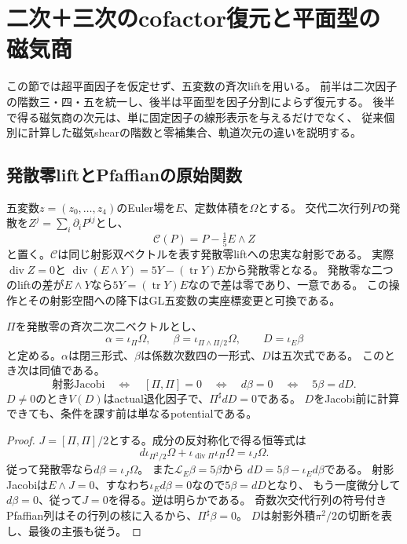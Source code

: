 \section{二次＋三次のcofactor復元と平面型の磁気商}\label{sec:quadric-reconstruction}
この節では超平面因子を仮定せず、五変数の斉次liftを用いる。
前半は二次因子の階数三・四・五を統一し、後半は平面型を因子分割によらず復元する。
後半で得る磁気商の次元は、単に固定因子の線形表示を与えるだけでなく、
従来個別に計算した磁気shearの階数と零補集合、軌道次元の違いを説明する。

\subsection{発散零liftとPfaffianの原始関数}
五変数$z=(z_0,\ldots,z_4)$のEuler場を$E$、定数体積を$\Omega$とする。
交代二次行列$P$の発散を$Z^j=\sum_i\partial_iP^{ij}$とし、
\[
 \mathcal C(P)=P-\tfrac15 E\wedge Z
\]
と置く。$\mathcal C$は同じ射影双ベクトルを表す発散零liftへの忠実な射影である。
実際$\operatorname{div}Z=0$と
$\operatorname{div}(E\wedge Y)=5Y-(\operatorname{tr}Y)E$から発散零となる。
発散零な二つのliftの差が$E\wedge Y$なら$5Y=(\operatorname{tr}Y)E$なので差は零であり、一意である。
この操作とその射影空間への降下はGL五変数の実座標変更と可換である。

\begin{proposition}[斉次Pfaffianの全Jacobi判定]\label{prop:cone-pfaffian-primitive}
$\Pi$を発散零の斉次二次二ベクトルとし、
\[
 \alpha=\iota_\Pi\Omega,\qquad
 \beta=\iota_{\Pi\wedge\Pi/2}\Omega,\qquad
 D=\iota_E\beta
\]
と定める。$\alpha$は閉三形式、$\beta$は係数次数四の一形式、$D$は五次式である。
このとき次は同値である。
\[
 \text{射影Jacobi}\quad\Longleftrightarrow\quad
 [\Pi,\Pi]=0\quad\Longleftrightarrow\quad
 d\beta=0\quad\Longleftrightarrow\quad 5\beta=dD.
\]
$D\ne0$のとき$V(D)$はactual退化因子で、$\Pi^\sharp dD=0$である。
$D$をJacobi前に計算できても、条件を課す前は単なるpotentialである。
\end{proposition}
\begin{proof}
$J=[\Pi,\Pi]/2$とする。成分の反対称化で得る恒等式は
\[
 d\iota_{\Pi^2/2}\Omega+
 \iota_{\operatorname{div}\Pi}\iota_\Pi\Omega=\iota_J\Omega.
\]
従って発散零なら$d\beta=\iota_J\Omega$。
また$\mathcal L_E\beta=5\beta$から
$dD=5\beta-\iota_Ed\beta$である。
射影Jacobiは$E\wedge J=0$、すなわち$\iota_Ed\beta=0$なので$5\beta=dD$となり、
もう一度微分して$d\beta=0$、従って$J=0$を得る。逆は明らかである。
奇数次交代行列の符号付きPfaffian列はその行列の核に入るから、$\Pi^\sharp\beta=0$。
$D$は射影外積$\pi^2/2$の切断を表し、最後の主張も従う。
\end{proof}

